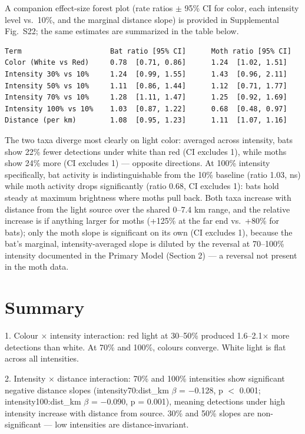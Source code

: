 \documentclass[11pt, letterpaper]{article}
\begin{document}
A companion effect-size forest plot (rate ratios $\pm$ 95\% CI for
color, each intensity level vs.\ 10\%, and the marginal distance slope)
is provided in Supplemental Fig.\ S22; the same estimates are
summarized in the table below.

\begin{verbatim}
Term                     Bat ratio [95% CI]      Moth ratio [95% CI]
Color (White vs Red)     0.78  [0.71, 0.86]      1.24  [1.02, 1.51]
Intensity 30% vs 10%     1.24  [0.99, 1.55]      1.43  [0.96, 2.11]
Intensity 50% vs 10%     1.11  [0.86, 1.44]      1.12  [0.71, 1.77]
Intensity 70% vs 10%     1.28  [1.11, 1.47]      1.25  [0.92, 1.69]
Intensity 100% vs 10%    1.03  [0.87, 1.22]      0.68  [0.48, 0.97]
Distance (per km)        1.08  [0.95, 1.23]      1.11  [1.07, 1.16]
\end{verbatim}

The two taxa diverge most clearly on light color: averaged across
intensity, bats show 22\% fewer detections under white than red (CI
excludes 1), while moths show 24\% more (CI excludes 1) --- opposite
directions. At 100\% intensity specifically, bat activity is
indistinguishable from the 10\% baseline (ratio 1.03, ns) while moth
activity drops significantly (ratio 0.68, CI excludes 1): bats hold
steady at maximum brightness where moths pull back. Both taxa increase
with distance from the light source over the shared 0--7.4 km range,
and the relative increase is if anything larger for moths (+125\% at
the far end vs.\ +80\% for bats); only the moth slope is significant on
its own (CI excludes 1), because the bat's marginal, intensity-averaged
slope is diluted by the reversal at 70--100\% intensity documented in
the Primary Model (Section 2) --- a reversal not present in the moth
data.

\section{Summary}

1. Colour $\times$ intensity interaction: red light at 30--50\% produced
   1.6--2.1$\times$ more detections than white. At 70\% and 100\%,
   colours converge. White light is flat across all intensities.

2. Intensity $\times$ distance interaction: 70\% and 100\% intensities
   show significant negative distance slopes (intensity70:dist\_km
   $\beta$ = $-$0.128, p $<$ 0.001; intensity100:dist\_km $\beta$ =
   $-$0.090, p = 0.001), meaning detections under high intensity
   increase with distance from source. 30\% and 50\% slopes are
   non-significant --- low intensities are distance-invariant.
\end{document}
